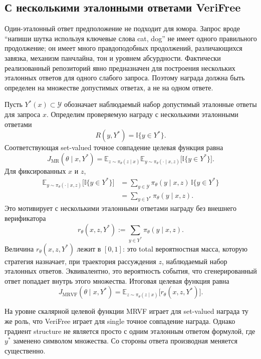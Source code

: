 \subsection{С несколькими эталонными ответами VeriFree}

Один-эталонный ответ предположение не подходит для юмора. Запрос вроде ``напиши шутка используя ключевые слова cat, dog'' не имеет одного правильного продолжение; он имеет много правдоподобных продолжений, различающихся завязка, механизм панчлайна, тон и уровнем абсурдности. Фактически реализованный репозиторий явно предназначен для построения нескольких эталонных ответов для одного слабого запроса. Поэтому награда должна быть определен на множестве допустимых ответах, а не на одном ответе.

Пусть \(Y^{*}(x)\subset\mathcal{Y}\) обозначает наблюдаемый набор допустимый эталонные ответы для запроса \(x\). Определим проверяемую награду с несколькими эталонными ответами
\[
 R(y,Y^{*})=\mathbb{I}\{y\in Y^{*}\}.
\]
Соответствующая set-valued точное совпадение целевая функция равна
\[
 J_{\mathrm{MR}}(\theta\mid x,Y^{*})
 =
 \mathbb{E}_{z\sim\pi_{\theta}(z\mid x)}
 \mathbb{E}_{y\sim\pi_{\theta}(\cdot\mid x,z)}
 \big[\mathbb{I}\{y\in Y^{*}\}\big].
\]
Для фиксированных \(x\) и \(z\),
\begin{align*}
 \mathbb{E}_{y\sim\pi_{\theta}(\cdot\mid x,z)}
 \big[\mathbb{I}\{y\in Y^{*}\}\big]
 & =
 \sum_{y\in\mathcal{Y}}
 \pi_{\theta}(y\mid x,z)\,\mathbb{I}\{y\in Y^{*}\} \\
 & =
 \sum_{y\in Y^{*}}
 \pi_{\theta}(y\mid x,z).
\end{align*}
Это мотивирует с несколькими эталонными ответами награду без внешнего верификатора
\[
 r_{\theta}(x,z,Y^{*})
 :=
 \sum_{y\in Y^{*}}
 \pi_{\theta}(y\mid x,z).
\]
Величина \(r_{\theta}(x,z,Y^{*})\) лежит в \([0,1]\): это total вероятностная масса, которую стратегия назначает, при траектория рассуждения \(z\), наблюдаемый набор эталонных ответов. Эквивалентно, это вероятность события, что сгенерированный ответ попадает внутрь этого множества. Итоговая целевая функция равна
\[
 J_{\mathrm{MRVF}}(\theta\mid x,Y^{*})
 =
 \mathbb{E}_{z\sim\pi_{\theta}(z\mid x)}
 \big[r_{\theta}(x,z,Y^{*})\big].
\]

На уровне скалярной целевой функции MRVF играет для set-valued награда ту же роль, что VeriFree играет для single точное совпадение награда. Однако градиент structure не является просто с одним эталонным ответом формулой, где \(y^{*}\) заменено символом множества. Со стороны ответа производная меняется существенно.

